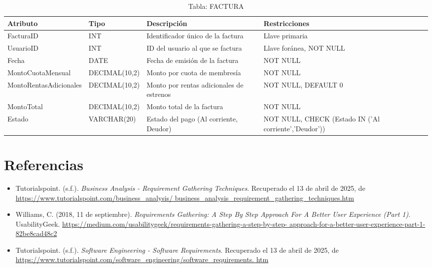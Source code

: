 \documentclass[12pt, a4paper]{article}
\begin{document}
\begin{table}[ht]
\centering
\caption{Tabla: FACTURA}
\begin{tabular}{|l|l|p{4.5cm}|p{3.5cm}|}
\hline
\textbf{Atributo} & \textbf{Tipo} & \textbf{Descripción} &
\textbf{Restricciones} \\
\hline
FacturaID & INT & Identificador único de la factura & Llave primaria \\
\hline
UsuarioID & INT & ID del usuario al que se factura & Llave foránea, NOT NULL \\
\hline
Fecha & DATE & Fecha de emisión de la factura & NOT NULL \\
\hline
MontoCuotaMensual & DECIMAL(10,2) & Monto por cuota de membresía & NOT NULL \\
\hline
MontoRentasAdicionales & DECIMAL(10,2) & Monto por rentas adicionales de
estrenos & NOT NULL, DEFAULT 0 \\
\hline
MontoTotal & DECIMAL(10,2) & Monto total de la factura & NOT NULL \\
\hline
Estado & VARCHAR(20) & Estado del pago (Al corriente, Deudor) & NOT NULL, CHECK
(Estado IN ('Al corriente','Deudor')) \\
\hline
\end{tabular}
\end{table}
\newpage

\section{Referencias}
\begin{itemize}
    \item Tutorialspoint. (s.f.). \textit{Business Analysis - Requirement
Gathering Techniques}. Recuperado el 13 de abril de 2025, de
\url{https://www.tutorialspoint.com/business_analysis/
business_analysis_requirement_gathering_techniques.htm}

    \item Williams, C. (2018, 11 de septiembre). \textit{Requirements Gathering:
A Step By Step Approach For A Better User Experience (Part 1)}. UsabilityGeek.
\url{https://medium.com/usabilitygeek/requirements-gathering-a-step-by-step-
approach-for-a-better-user-experience-part-1-82be8cad48c2}

    \item Tutorialspoint. (s.f.). \textit{Software Engineering - Software
Requirements}. Recuperado el 13 de abril de 2025, de
\url{https://www.tutorialspoint.com/software_engineering/software_requirements.
htm}
\end{itemize}
\end{document}
